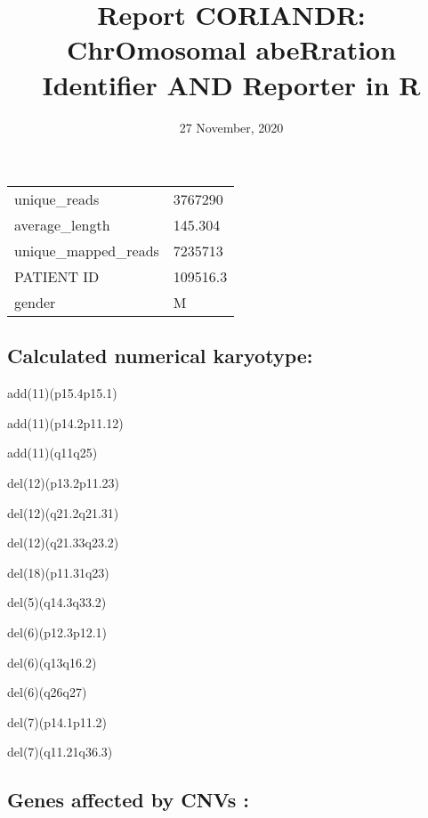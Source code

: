 \documentclass[]{article}
\title{Report CORIANDR: ChrOmosomal abeRration Identifier AND Reporter in R}
\author{}
\date{27 November, 2020}
\begin{document}
\maketitle

\begin{longtable}[]{@{}ll@{}}
\toprule
\endhead
unique\_reads & 3767290\tabularnewline
average\_length & 145.304\tabularnewline
unique\_mapped\_reads & 7235713\tabularnewline
PATIENT ID & 109516.3\tabularnewline
gender & M\tabularnewline
\bottomrule
\end{longtable}

\hypertarget{calculated-numerical-karyotype}{%
\subsection{Calculated numerical
karyotype:}\label{calculated-numerical-karyotype}}

add(11)(p15.4p15.1)

add(11)(p14.2p11.12)

add(11)(q11q25)

del(12)(p13.2p11.23)

del(12)(q21.2q21.31)

del(12)(q21.33q23.2)

del(18)(p11.31q23)

del(5)(q14.3q33.2)

del(6)(p12.3p12.1)

del(6)(q13q16.2)

del(6)(q26q27)

del(7)(p14.1p11.2)

del(7)(q11.21q36.3)

\hypertarget{genes-affected-by-cnvs}{%
\subsection{Genes affected by CNVs :}\label{genes-affected-by-cnvs}}
\end{document}
